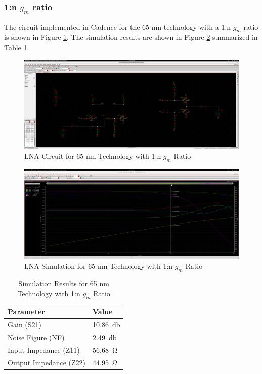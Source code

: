 \subsubsection{1:n $g_m$ ratio}

The circuit implemented in Cadence for the 65 nm technology with a 1:n $g_m$ ratio is shown in Figure \ref{fig:65nm_1ton-circ}. The simulation results are shown in Figure \ref{fig:65nm_1ton} summarized in Table \ref{tab:65nm_1ton_results}.

\begin{figure}[H]
    \centering
    \includegraphics[width=1\textwidth]{Images/65nm1To35Circ.png}
    \caption{LNA Circuit for 65 nm Technology with 1:n $g_m$ Ratio}
    \label{fig:65nm_1ton-circ}
\end{figure}

\begin{figure}[H]
    \centering
    \includegraphics[width=1\textwidth]{Images/65nm1To35Final.png}
    \caption{LNA Simulation for 65 nm Technology with 1:n $g_m$ Ratio}
    \label{fig:65nm_1ton}
\end{figure}

\begin{table}[H]
    \centering
    \caption{Simulation Results for 65 nm Technology with 1:n $g_m$ Ratio}
    \begin{tabularx}{\textwidth}{>{\centering\arraybackslash}X >{\centering\arraybackslash}X }
        \toprule
        \textbf{Parameter} & \textbf{Value}\\
        \midrule
        Gain (S21) & \SI{10.86}{\decibel} \\
        \midrule
        Noise Figure (NF) & \SI{2.49}{\decibel} \\
        \midrule
        Input Impedance (Z11) & \SI{56.68}{\ohm} \\
        \midrule
        Output Impedance (Z22) & \SI{44.95}{\ohm} \\
        \bottomrule
    \end{tabularx}
    \label{tab:65nm_1ton_results}
\end{table}



